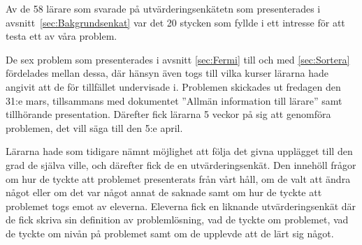 \textcolor{lila}{Av de 58 lärare som svarade på utvärderingsenkätetn som presenterades i avsnitt~\ref{sec:Bakgrundsenkat} var det 20 stycken som fyllde i ett intresse för att testa ett av våra problem.} 

\textcolor{lila}{De sex problem som presenterades i avsnitt \ref{sec:Fermi} till och med \ref{sec:Sortera} fördelades mellan dessa, där hänsyn även togs till vilka kurser lärarna hade angivit att de för tillfället undervisade i. Problemen skickades ut fredagen den 31:e mars, tillsammans med dokumentet ''Allmän information till lärare'' samt tillhörande presentation. Därefter fick lärarna 5 veckor på sig att genomföra problemen, det vill säga till den 5:e april.} 

\textcolor{lila}{Lärarna hade som tidigare nämnt möjlighet att följa det givna upplägget till den grad de själva ville, och därefter fick de en utvärderingsenkät. Den innehöll frågor om hur de tyckte att problemet presenterats från vårt håll, om de valt att ändra något eller om det var något annat de saknade samt om hur de tyckte att problemet togs emot av eleverna. Eleverna fick en liknande utvärderingsenkät där de fick skriva sin definition av problemlösning, vad de tyckte om problemet, vad de tyckte om nivån på problemet samt om de upplevde att de lärt sig något.}